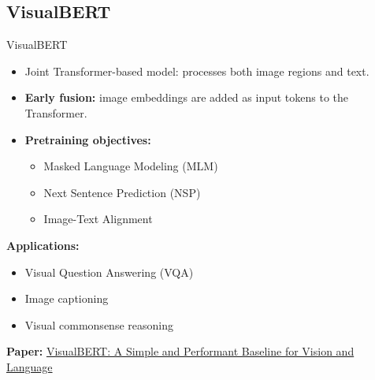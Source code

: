 \subsection{VisualBERT}
\begin{frame}[allowframebreaks]{VisualBERT}
    \begin{itemize}
        \vspace{-0.5em}
        \item Joint Transformer-based model: processes both image regions and text.
        \item \textbf{Early fusion:} image embeddings are added as input tokens to the Transformer.
        \item \textbf{Pretraining objectives:}
        \begin{itemize}
            \vspace{-0.5em}
            \item Masked Language Modeling (MLM)
            \item Next Sentence Prediction (NSP)
            \item Image-Text Alignment
        \end{itemize}
    \end{itemize}
    \textbf{Applications:}
    \begin{itemize}
        \vspace{-0.5em}
        \item Visual Question Answering (VQA)
        \item Image captioning
        \item Visual commonsense reasoning
    \end{itemize}
    \textbf{Paper:} \href{https://arxiv.org/abs/1908.03557}{VisualBERT: A Simple and Performant Baseline for Vision and Language}
\end{frame}


